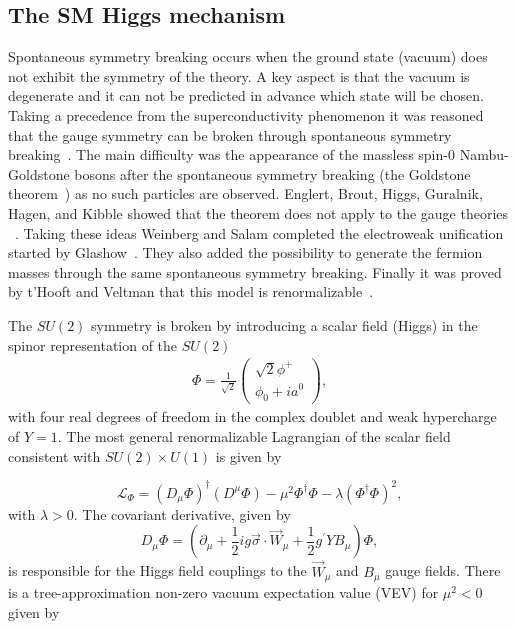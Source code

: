 \subsection{The SM Higgs mechanism}

Spontaneous symmetry breaking occurs when the ground state (vacuum) does not exhibit the symmetry of the theory. A key aspect is that the vacuum is degenerate and it can not be predicted in advance which state will be chosen. Taking a precedence from the superconductivity phenomenon it was reasoned that the gauge symmetry can be broken through spontaneous symmetry breaking~\cite{Nambu:1960tm,Anderson:1963pc}. The main difficulty was the appearance of the massless spin-$0$ Nambu-Goldstone bosons after the spontaneous symmetry breaking (the Goldstone theorem~\cite{Goldstone:1962es}) as no such particles are observed. Englert, Brout, Higgs, Guralnik, Hagen, and Kibble showed that the theorem does not apply to the gauge theories ~\cite{Englert:1964et,Higgs:1964ia,Higgs:1964pj,Guralnik:1964eu,Higgs:1966ev,Kibble:1967sv}.  Taking these ideas Weinberg and Salam completed the electroweak unification started by Glashow~\cite{Glashow:1961tr,Weinberg:1967tq,Salam:1968rm}. They also added the possibility to generate the fermion masses through the same spontaneous symmetry breaking. Finally it was proved by t'Hooft and Veltman that this model is renormalizable~\cite{tHooft:1972fi}. 

The $SU(2)$ symmetry is broken by introducing a scalar field (Higgs) in the spinor representation of the $SU(2)$ 
\begin{eqnarray} \label{eq:lang_higgs}
\Phi  = \frac{1}{\sqrt{2}}\left(\begin{array}{c} \sqrt{2}\phi^{+}\\ \phi_{0}+ia^{0} \end{array} \right),
\end{eqnarray}   
with four real degrees of freedom in the complex doublet and weak hypercharge of $Y=1$. The most general renormalizable Lagrangian of the scalar field consistent with $SU(2) \times U(1)$ is given by

\begin{equation} \label{eq:ewk_higgs}
\mathcal{L_{\Phi}} = (D_{\mu}\Phi)^{\dagger} (D^{\mu}\Phi) - \mu^2 \Phi^{\dagger}\Phi - \lambda (\Phi^{\dagger}\Phi)^2,
\end{equation}
with $\lambda>0$. The covariant derivative, given by
\begin{equation} \label{eq:higgs_cov}
D_{\mu}\Phi = (\partial_{\mu}+\frac{1}{2}ig\vec{\sigma}\cdot\vec{W}_{\mu}+\frac{1}{2}g^{'}YB_{\mu})\Phi,
\end{equation}
is responsible for the Higgs field couplings to the $\vec{W}_{\mu}$ and $B_{\mu}$ gauge fields. There is a tree-approximation non-zero vacuum expectation value (VEV) for $\mu^2<0$ given by

